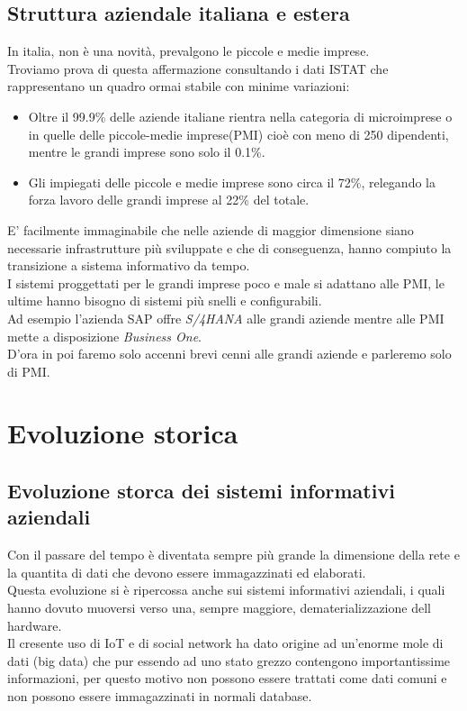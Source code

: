 \documentclass[../main.tex]{subfiles}
\begin{document}
	\subsection{Struttura aziendale italiana e estera}
	In italia, non è una novità, prevalgono le piccole e medie imprese.\\
	Troviamo prova di questa affermazione consultando i dati ISTAT che rappresentano un quadro ormai stabile con minime variazioni:
	\begin{itemize}
		\item Oltre il 99.9\% delle aziende italiane rientra nella categoria di microimprese o in quelle delle piccole-medie imprese(PMI) cioè con meno di 250 dipendenti, mentre le grandi imprese sono solo il 0.1\%.
		\item Gli impiegati delle piccole e medie imprese sono circa il 72\%, relegando la forza lavoro delle grandi imprese al 22\% del totale.
	\end{itemize}
	E' facilmente immaginabile che nelle aziende di maggior dimensione siano necessarie infrastrutture più sviluppate e che di conseguenza, hanno compiuto la transizione a sistema informativo da tempo.\\
	I sistemi proggettati per le grandi imprese poco e male si adattano alle PMI, le ultime hanno bisogno di sistemi più snelli e configurabili.\\
	Ad esempio l'azienda SAP offre \emph{S/4HANA} alle grandi aziende mentre alle PMI mette a disposizione \emph{Business One}.\\
	D'ora in poi faremo solo accenni brevi cenni alle grandi aziende e parleremo solo di PMI.
	\section{Evoluzione storica}
	\subsection{Evoluzione storca dei sistemi informativi aziendali}
	Con il passare del tempo è diventata sempre più grande la dimensione della rete e la quantita di dati che devono essere immagazzinati ed elaborati.\\
	Questa evoluzione si è ripercossa anche sui sistemi informativi aziendali, i quali hanno dovuto muoversi verso una, sempre maggiore, dematerializzazione dell hardware.\\
	Il cresente uso di IoT e di social network ha dato origine ad un'enorme mole di dati (big data) che pur essendo ad uno stato grezzo contengono importantissime informazioni, per questo motivo non possono essere trattati come dati comuni e non possono essere immagazzinati in normali database.
\end{document}
